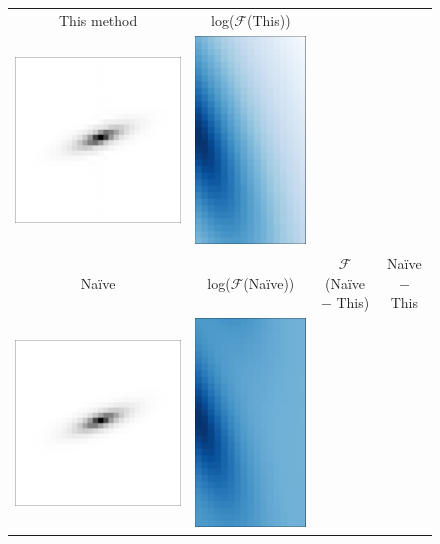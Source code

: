 \documentclass[11pt,letterpaper]{aastex63}
\begin{document}
\begin{figure}[p!]
  \newcommand{\F}{$\mathcal{F}$}
  \begin{center}
    \begin{tabular}{@{}ccccc@{}}
      This method
      &
      log(\F(This))
      &
      \\
      \includegraphics[height=0.24\textwidth]{lopass-mine-pix}
      &
      \includegraphics[height=0.24\textwidth]{lopass-mine-logfourier}
      &
      \\
      Na\"ive
      & log(\F(Na\"ive))
      &
      \multicolumn{2}{c}{\F(Na\"ive $-$ This)}
      & Na\"ive $-$ This
      \\
      \includegraphics[height=0.24\textwidth]{lopass-naive-pix}
      &
      \includegraphics[height=0.24\textwidth]{lopass-naive-logfourier}

\end{tabular}
\end{center}
\end{figure}
\end{document}
